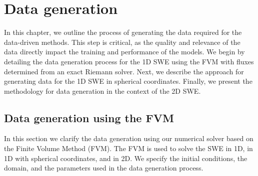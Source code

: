 \chapter{Data generation}\label{ch:method}
In this chapter, we outline the process of generating the data required for the data-driven methods.
This step is critical, as the quality and relevance of the data directly impact the training and performance of the models.
We begin by detailing the data generation process for the 1D SWE using the FVM with fluxes determined from an exact Riemann solver.
Next, we describe the approach for generating data for the 1D SWE in spherical coordinates.
Finally, we present the methodology for data generation in the context of the 2D SWE.


\section{Data generation using the FVM}\label{sec:data_generation_fvm}
In this section we clarify the data generation using our numerical solver based on the Finite Volume Method (FVM).
The FVM is used to solve the SWE in 1D, in 1D with spherical coordinates, and in 2D.
We specify the initial conditions, the domain, and the parameters used in the data generation process.

